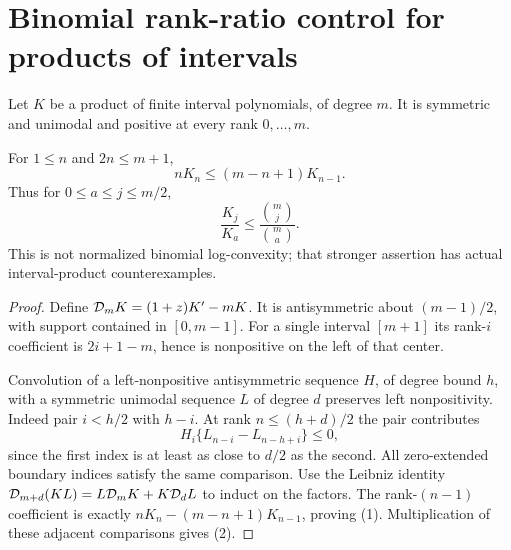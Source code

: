 \section{Binomial rank-ratio control for products of intervals}
Let $K$ be a product of finite interval polynomials, of degree $m$.
It is symmetric and unimodal and positive at every rank $0,\ldots,m$.

\begin{theorem}
For $1\le n$ and $2n\le m+1$,
\[
                      nK_n\le(m-n+1)K_{n-1}.          \tag{1}
\]
Thus for $0\le a\le j\le m/2$,
\[
          \frac{K_j}{K_a}\le
                         \frac{\binom mj}{\binom ma}. \tag{2}
\]
This is not normalized binomial log-convexity; that stronger
assertion has actual interval-product counterexamples.
\end{theorem}
\begin{proof}
Define ${\cal D}_mK=(1+z)K'-mK$. It is antisymmetric about
$(m-1)/2$, with support contained in $[0,m-1]$.
For a single interval $[m+1]$ its rank-$i$ coefficient is
$2i+1-m$, hence is nonpositive on the left of that center.

Convolution of a left-nonpositive antisymmetric sequence $H$,
of degree bound $h$, with a symmetric unimodal sequence $L$
of degree $d$ preserves left nonpositivity. Indeed pair
$i<h/2$ with $h-i$. At rank $n\le(h+d)/2$ the pair contributes
\[
                  H_i\{L_{n-i}-L_{n-h+i}\}\le0,
\]
since the first index is at least as close to $d/2$ as the second.
All zero-extended boundary indices satisfy the same comparison.
Use the Leibniz identity
${\cal D}_{m+d}(KL)=L{\cal D}_mK+K{\cal D}_dL$
to induct on the factors. The rank-$(n-1)$ coefficient is exactly
$nK_n-(m-n+1)K_{n-1}$, proving (1). Multiplication of these
adjacent comparisons gives (2).
\end{proof}

